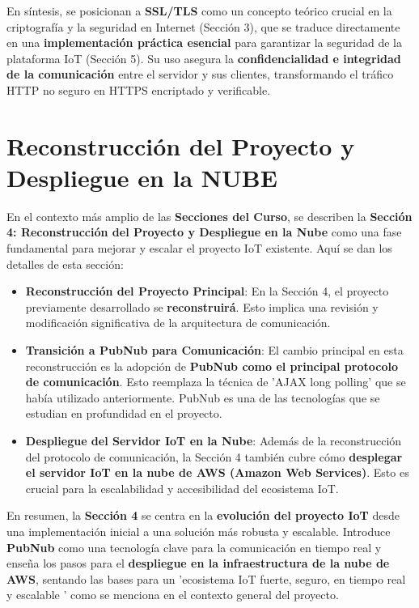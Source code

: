 \documentclass{report}
\begin{document}
En síntesis, se  posicionan a \textbf{SSL/TLS} como un concepto teórico crucial en la criptografía y la seguridad en Internet (Sección 3), 
que se traduce directamente en una \textbf{implementación práctica esencial} para garantizar la seguridad de la plataforma IoT (Sección 5). Su uso 
asegura la \textbf{confidencialidad e integridad de la comunicación} entre el servidor y sus clientes, transformando el tráfico HTTP no seguro en 
HTTPS encriptado y verificable.

\section{Reconstrucción del Proyecto y Despliegue en la NUBE}
En el contexto más amplio de las \textbf{Secciones del Curso}, se  describen la \textbf{Sección 4: Reconstrucción del Proyecto y Despliegue 
en la Nube} como una fase fundamental para mejorar y escalar el proyecto IoT existente. Aquí se dan los detalles de esta sección:

\begin{itemize}
    \item \textbf{Reconstrucción del Proyecto Principal}: En la Sección 4, el proyecto previamente desarrollado se \textbf{reconstruirá}. Esto implica 
    una revisión y modificación significativa de la arquitectura de comunicación.
    \item \textbf{Transición a PubNub para Comunicación}: El cambio principal en esta reconstrucción es la adopción de \textbf{PubNub como el 
    principal protocolo de comunicación}. Esto reemplaza la técnica de  'AJAX long polling' que se había utilizado anteriormente. PubNub es una 
    de las tecnologías que se estudian en profundidad en el proyecto.
    \item \textbf{Despliegue del Servidor IoT en la Nube}: Además de la reconstrucción del protocolo de comunicación, la Sección 4 también cubre 
    cómo \textbf{desplegar el servidor IoT en la nube de AWS (Amazon Web Services)}. Esto es crucial para la escalabilidad y accesibilidad del ecosistema IoT.
\end{itemize}
En resumen, la \textbf{Sección 4} se centra en la \textbf{evolución del proyecto IoT} desde una implementación inicial a una solución más robusta y 
escalable. Introduce \textbf{PubNub} como una tecnología clave para la comunicación en tiempo real y enseña los pasos para el \textbf{despliegue en 
la infraestructura de la nube de AWS}, sentando las bases para un  'ecosistema IoT fuerte, seguro, en tiempo real y escalable ' como se menciona en el 
contexto general del proyecto.
\end{document}
